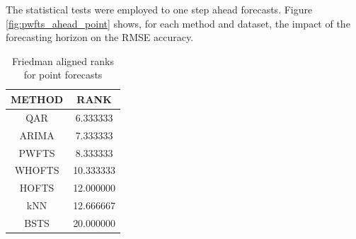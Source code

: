 The statistical tests were employed to one step ahead forecasts. Figure \ref{fig:pwfts_ahead_point} shows, for each method and dataset, the impact of the forecasting horizon on the RMSE accuracy.

\begin{table}[ht]
    \caption{RMSE for one step ahead point forecasts}
    \label{tab:pwfts_point_results}
\end{table}

\begin{table}[hbt]
    \centering
    \begin{tabular}{|c|c|}
\hline
       METHOD &       RANK \\
\hline
QAR &   6.333333 \\
ARIMA &   7.333333 \\
PWFTS &   8.333333 \\
WHOFTS &  10.333333 \\
HOFTS &  12.000000 \\
kNN &  12.666667 \\
BSTS &  20.000000 \\
\hline
\end{tabular}
    \caption{Friedman aligned ranks for point forecasts}
    \label{tab:pwfts_point_ranks}
\end{table}

